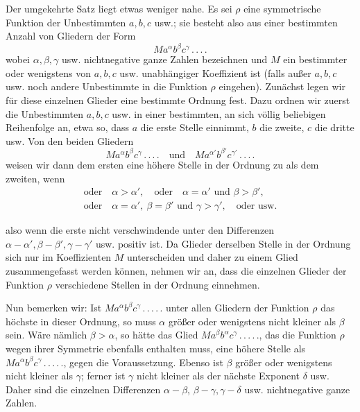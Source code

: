 Der umgekehrte Satz liegt etwas weniger nahe. Es sei $\rho$ eine symmetrische Funktion der Unbestimmten $a,b,c$ usw.; sie besteht also aus einer bestimmten Anzahl von Gliedern der Form
\[
Ma^\alpha b^\beta c^\gamma\, .\, .\, .\, .
\]
wobei $\alpha,\beta,\gamma$ usw. nichtnegative ganze Zahlen bezeichnen und $M$ ein bestimmter oder wenigstens von $a,b,c$ usw. unabhängiger Koeffizient ist (falls außer $a,b,c$ usw. noch andere Unbestimmte in die Funktion $\rho$ eingehen). Zunächst legen wir für diese einzelnen Glieder eine bestimmte Ordnung fest. Dazu ordnen wir zuerst die Unbestimmten $a,b,c$ usw. in einer bestimmten, an sich völlig beliebigen Reihenfolge an, etwa so, dass $a$ die erste Stelle einnimmt, $b$ die zweite, $c$ die dritte usw. Von den beiden Gliedern
\[
Ma^\alpha b^\beta c^\gamma\, .\, .\, .\, .\quad\text{und}\quad Ma^{\alpha'}b^{\beta'}c^{\gamma'}\, .\, .\, .\, .
\]
weisen wir dann dem ersten eine höhere Stelle in der Ordnung zu als dem zweiten, wenn
\[
\begin{gathered}\text{oder}\quad\alpha>\alpha',\quad\text{oder}\quad\alpha=\alpha'\text{ und }\beta>\beta',\\\text{oder}\quad\alpha=\alpha',\ \beta=\beta'\text{ und }\gamma>\gamma',\quad\text{oder usw.}\end{gathered}
\]

also wenn die erste nicht verschwindende unter den Differenzen $\alpha-\alpha',\beta-\beta',\gamma-\gamma'$ usw. positiv ist. Da Glieder derselben Stelle in der Ordnung sich nur im Koeffizienten $M$ unterscheiden und daher zu einem Glied zusammengefasst werden können, nehmen wir an, dass die einzelnen Glieder der Funktion $\rho$ verschiedene Stellen in der Ordnung einnehmen.

Nun bemerken wir: Ist $Ma^\alpha b^\beta c^\gamma\, .\, .\, .\, .\, .$ unter allen Gliedern der Funktion $\rho$ das höchste in dieser Ordnung, so muss $\alpha$ größer oder wenigstens nicht kleiner als $\beta$ sein. Wäre nämlich $\beta>\alpha$, so hätte das Glied $Ma^\beta b^\alpha c^\gamma\, .\, .\, .\, .\, .$, das die Funktion $\rho$ wegen ihrer Symmetrie ebenfalls enthalten muss, eine höhere Stelle als $Ma^\alpha b^\beta c^\gamma\, .\, .\, .\, .\, .$, gegen die Voraussetzung. Ebenso ist $\beta$ größer oder wenigstens nicht kleiner als $\gamma$; ferner ist $\gamma$ nicht kleiner als der nächste Exponent $\delta$ usw. Daher sind die einzelnen Differenzen $\alpha-\beta$, $\beta-\gamma,\gamma-\delta$ usw. nichtnegative ganze Zahlen.

